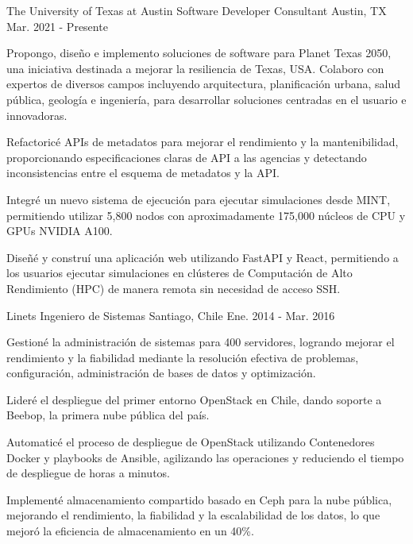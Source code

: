 \begin{cventries}
  \cventry
    {The University of Texas at Austin}
    {Software Developer Consultant}
    {Austin, TX}
    {Mar. 2021 - Presente}
    {
      \begin{cvitems}
        \item{Propongo, diseño e implemento soluciones de software para Planet Texas 2050, una iniciativa destinada a mejorar la resiliencia de Texas, USA. Colaboro con expertos de diversos campos incluyendo arquitectura, planificación urbana, salud pública, geología e ingeniería, para desarrollar soluciones centradas en el usuario e innovadoras.}
        \item{Refactoricé APIs de metadatos para mejorar el rendimiento y la mantenibilidad, proporcionando especificaciones claras de API a las agencias y detectando inconsistencias entre el esquema de metadatos y la API.}
        \item{Integré un nuevo sistema de ejecución para ejecutar simulaciones desde MINT, permitiendo utilizar 5,800 nodos con aproximadamente 175,000 núcleos de CPU y GPUs NVIDIA A100.}
        \item{Diseñé y construí una aplicación web utilizando FastAPI y React, permitiendo a los usuarios ejecutar simulaciones en clústeres de Computación de Alto Rendimiento (HPC) de manera remota sin necesidad de acceso SSH.}
      \end{cvitems}
    }

  \cventry
    {Linets}
    {Ingeniero de Sistemas}
    {Santiago, Chile}
    {Ene. 2014 - Mar. 2016}
    {
      \begin{cvitems}
        \item{Gestioné la administración de sistemas para 400 servidores, logrando mejorar el rendimiento y la fiabilidad mediante la resolución efectiva de problemas, configuración, administración de bases de datos y optimización.}
        \item{Lideré el despliegue del primer entorno OpenStack en Chile, dando soporte a Beebop, la primera nube pública del país.}
        \item{Automaticé el proceso de despliegue de OpenStack utilizando Contenedores Docker y playbooks de Ansible, agilizando las operaciones y reduciendo el tiempo de despliegue de horas a minutos.}
        \item{Implementé almacenamiento compartido basado en Ceph para la nube pública, mejorando el rendimiento, la fiabilidad y la escalabilidad de los datos, lo que mejoró la eficiencia de almacenamiento en un 40\%.}
      \end{cvitems}
    }

\end{cventries}